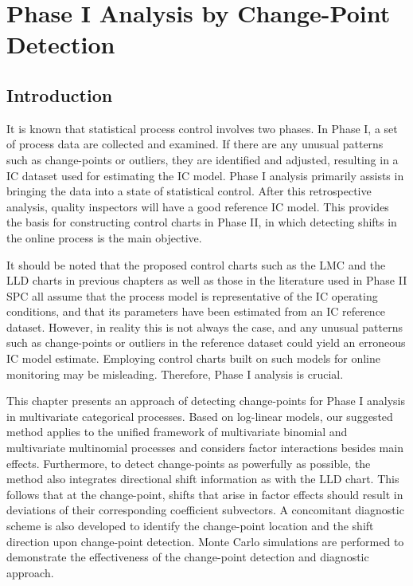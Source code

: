 \chapter{Phase I Analysis by Change-Point Detection}\label{chp4}


\section{Introduction}\label{sec4.1}

It is known that statistical process control involves two phases. In Phase I, a set
of process data are collected and examined. If there are any unusual patterns such
as change-points or outliers, they are identified and adjusted, resulting in a IC
dataset used for estimating the IC model. Phase I analysis primarily assists in
bringing the data into a state of statistical control. After this retrospective
analysis, quality inspectors will have a good reference IC model. This provides the
basis for constructing control charts in Phase II, in which detecting shifts in the
online process is the main objective.

It should be noted that the proposed control charts such as the LMC and the LLD
charts in previous chapters as well as those in the literature used in Phase II SPC
all assume that the process model is representative of the IC operating conditions,
and that its parameters have been estimated from an IC reference dataset. However,
in reality this is not always the case, and any unusual patterns such as
change-points or outliers in the reference dataset could yield an erroneous IC model
estimate. Employing control charts built on such models for online monitoring may be
misleading. Therefore, Phase I analysis is crucial.

This chapter presents an approach of detecting change-points for Phase I analysis in
multivariate categorical processes. Based on log-linear models, our suggested method
applies to the unified framework of multivariate binomial and multivariate
multinomial processes and considers factor interactions besides main effects.
Furthermore, to detect change-points as powerfully as possible, the method also
integrates directional shift information as with the LLD chart. This follows that at
the change-point, shifts that arise in factor effects should result in deviations of
their corresponding coefficient subvectors. A concomitant diagnostic scheme is also
developed to identify the change-point location and the shift direction upon
change-point detection. Monte Carlo simulations are performed to demonstrate the
effectiveness of the change-point detection and diagnostic approach.



